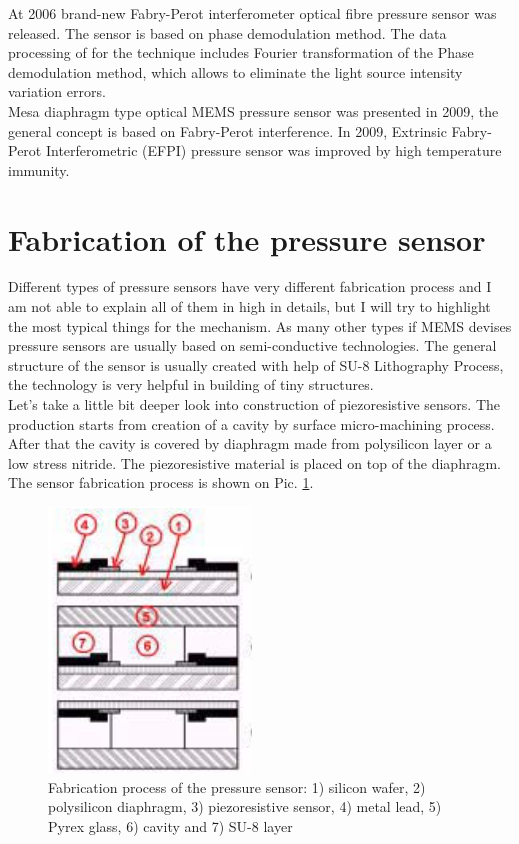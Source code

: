 \documentclass[english]{article}
\begin{document}
At 2006 brand-new Fabry-Perot interferometer optical fibre pressure sensor was released. The sensor is based on phase demodulation method. The data processing of for the technique includes Fourier transformation of the Phase demodulation method, which allows to eliminate the light source intensity variation errors.\\

Mesa diaphragm type optical MEMS pressure sensor was presented in 2009, the general concept is based on Fabry-Perot interference. In 2009, Extrinsic Fabry-Perot Interferometric (EFPI) pressure sensor was improved by high temperature immunity.\cite{hist}

\section{Fabrication of the pressure sensor}

 Different types of pressure sensors have very different fabrication process and I am not able to explain all of them in high in details, but I will try to highlight the most typical things for the mechanism. As many other types if MEMS devises pressure sensors are usually based on semi-conductive technologies. The general structure of the sensor is usually created with help of SU-8 Lithography Process, the technology is very helpful in building of tiny structures.\\
 
 Let's take a little bit deeper look into construction of piezoresistive sensors. The production starts from creation of a cavity by surface micro-machining process. After that the cavity is covered by diaphragm made from polysilicon layer or a low stress nitride. The piezoresistive material is placed on top of the diaphragm. The sensor fabrication process is shown on Pic. \ref{fig:fabrik}.\cite{fabrik}\\
 
 \begin{figure}[H]
\centerline{\includegraphics[scale=0.5]{PressureSensors/fabrik}}
\caption{Fabrication process of the pressure sensor: 1) silicon wafer, 2) polysilicon diaphragm, 3) piezoresistive sensor, 4) metal lead, 5) Pyrex glass, 6) cavity and 7) SU-8 layer\label{fig:fabrik}}
\end{figure}
\end{document}
